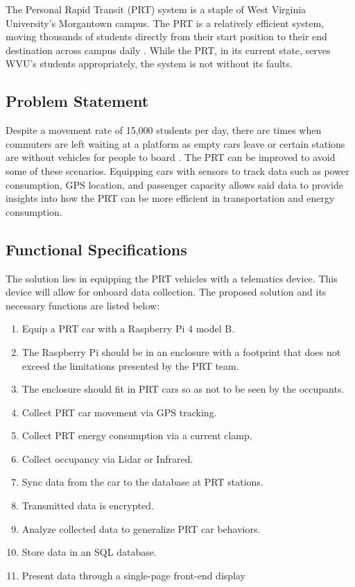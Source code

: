The Personal Rapid Transit (PRT) system is a staple of West Virginia University’s Morgantown campus. The PRT is a relatively efficient system, moving thousands of students directly from their start position to their end destination across campus daily \cite{about-prt}. While the PRT, in its current state, serves WVU’s students appropriately, the system is not without its faults.

\subsection{Problem Statement}
Despite a movement rate of 15,000 students per day, there are times when commuters are left waiting at a platform as empty cars leave or certain stations are without vehicles for people to board \cite{about-prt}. The PRT can be improved to avoid some of these scenarios. Equipping cars with sensors to track data such as power consumption, GPS location, and passenger capacity allows said data to provide insights into how the PRT can be more efficient in transportation and energy consumption.
\subsection{Functional Specifications}
The solution lies in equipping the PRT vehicles with a telematics device. This device will allow for onboard data collection. The proposed solution and its necessary functions are listed below:
\begin{enumerate}
    \item Equip a PRT car with a Raspberry Pi 4 model B.
    \item The Raspberry Pi should be in an enclosure with a footprint that does not exceed the limitations presented by the PRT team.
    \item The enclosure should fit in PRT cars so as not to be seen by the occupants.
    \item Collect PRT car movement via GPS tracking.
    \item Collect PRT energy consumption via a current clamp.
    \item Collect occupancy via Lidar or Infrared.
    \item Sync data from the car to the database at PRT stations.
    \item Transmitted data is encrypted.
    \item Analyze collected data to generalize PRT car behaviors.
    \item Store data in an SQL database.
    \item Present data through a single-page front-end display
\end{enumerate}

